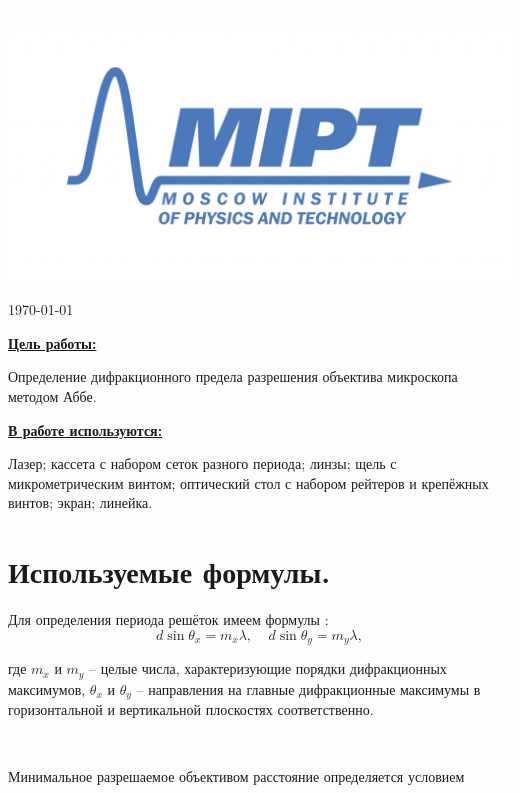 \documentclass[a4paper, 12pt, twoside]{article}
\newenvironment{bottompar}{\par\vspace*{\fill}}{\clearpage}
\begin{document}
\begin{titlepage}
		\begin{bottompar}
			\begin{center}
				\includegraphics[width = 80 mm]{logo.jpg}
			\end{center}
			{\large \today}
			
		\end{bottompar}
		\vfill %
		
	\end{titlepage}
	
	{\Large \uline { \textbf  {Цель работы:}}}
	
	\vspace{2mm}
	Определение дифракционного предела разрешения объектива микроскопа методом Аббе.
	\vspace{\baselineskip}
	
	{\Large \uline { \textbf  {В работе используются:}}}
	
	\vspace{2mm}
	
	Лазер; кассета с набором сеток разного периода; линзы; щель с микрометрическим винтом; оптический стол с набором рейтеров и крепёжных винтов; экран; линейка.
	
	\section{Используемые формулы.}
	Для определения периода решёток имеем формулы :
	\begin{equation}
	\label{f1}
	d \sin \theta_x = m_x \lambda,~~~~~ d \sin \theta_y = m_y \lambda,
	\end{equation}
	
	где $m_x$ и $m_y$ -- целые числа, характеризующие порядки дифракционных максимумов, $\theta_x$ и $\theta_y$ -- направления на главные дифракционные максимумы в горизонтальной и вертикальной плоскостях соответственно.
	
	~
	
	Минимальное разрешаемое объективом расстояние определяется условием 
	
\end{document}
